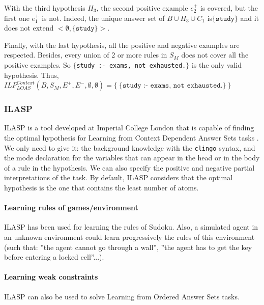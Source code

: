 \begin{example}
\bigskip

With the third hypothesis $H_3$, the second positive example $e^+_2$ is covered, but the first one $e^+_1$ is not. Indeed, the unique answer set of $B\cup H_3 \cup C_1$ is$\{\texttt{study}\}$ and it does not extend $<\emptyset, \{\texttt{study}\}>$.

\bigskip

Finally, with the last hypothesis, all the positive and negative examples are respected. Besides, every union of 2 or more rules in $S_M$ does not cover all the positive examples. So $\{$\texttt{study :- exams, not exhausted.}$\}$ is the only valid hypothesis. Thus, $ILP_{LOAS}^{Context}(B, S_M, E^+, E^-, \emptyset, \emptyset) = \{\:\{\texttt{study :- exams, not exhausted.}\}\:\}$

\end{example}

\subsubsection{ILASP}

ILASP is a tool developed at Imperial College London that is capable of finding the optimal hypothesis for Learning from Context Dependent Answer Sets tasks . We only need to give it: the background knowledge with the \texttt{clingo} syntax, and the mode declaration for the variables that can appear in the head or in the body of a rule in the hypothesis. We can also specify the positive and negative partial interpretations of the task. By default, ILASP considers that the optimal hypothesis is the one that contains the least number of atoms.

\paragraph{Learning rules of games/environment}

ILASP has been used for learning the rules of Sudoku. Also, a simulated agent in an unknown environment could learn progressively the rules of this environment (such that: ”the agent cannot go through a wall”, ”the agent has to get the key before entering a locked cell”...).

\paragraph{Learning weak constraints}

ILASP can also be used to solve Learning from Ordered Answer Sets tasks.


